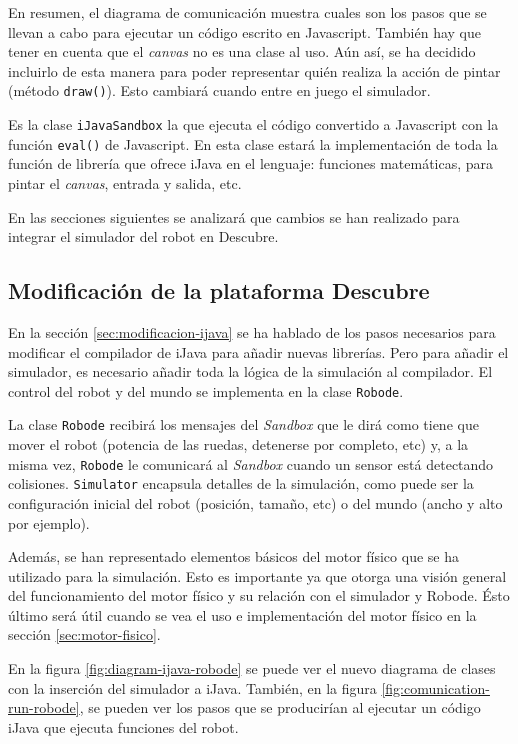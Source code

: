 En resumen, el diagrama de comunicación muestra cuales son los pasos que se llevan a cabo para ejecutar un código escrito en Javascript. También hay que tener en cuenta que el \emph{canvas} no es una clase al uso. Aún así, se ha decidido incluirlo de esta manera para poder representar quién realiza la acción de pintar (método \texttt{draw()}). Esto cambiará cuando entre en juego el simulador.

Es la clase \texttt{iJavaSandbox} la que ejecuta el código convertido a Javascript con la función \texttt{eval()} de Javascript. En esta clase estará la implementación de toda la función de librería que ofrece iJava en el lenguaje: funciones matemáticas, para pintar el \emph{canvas}, entrada y salida, etc.

En las secciones siguientes se analizará que cambios se han realizado para integrar el simulador del robot en Descubre.

\subsection{Modificación de la plataforma Descubre}
\label{sec:modificacion-descubre}


En la sección \ref{sec:modificacion-ijava} se ha hablado de los pasos necesarios para modificar el compilador de iJava para añadir nuevas librerías. Pero para añadir el simulador, es necesario añadir toda la lógica de la simulación al compilador. El control del robot y del mundo se implementa en la clase \texttt{Robode}.

La clase \texttt{Robode} recibirá los mensajes del \emph{Sandbox} que le dirá como tiene que mover el robot (potencia de las ruedas, detenerse por completo, etc) y, a la misma vez, \texttt{Robode} le comunicará al \emph{Sandbox} cuando un sensor está detectando colisiones. \texttt{Simulator} encapsula detalles de la simulación, como puede ser la configuración inicial del robot (posición, tamaño, etc) o del mundo (ancho y alto por ejemplo). 

Además, se han representado elementos básicos del motor físico que se ha utilizado para la simulación. Esto es importante ya que otorga una visión general del funcionamiento del motor físico y su relación con el simulador y Robode. Ésto último será útil cuando se vea el uso e implementación del motor físico en la sección \ref{sec:motor-fisico}.

En la figura \ref{fig:diagram-ijava-robode} se puede ver el nuevo diagrama de clases con la inserción del simulador a iJava. También, en la figura \ref{fig:comunication-run-robode}, se pueden ver los pasos que se producirían al ejecutar un código iJava que ejecuta funciones del robot. 

